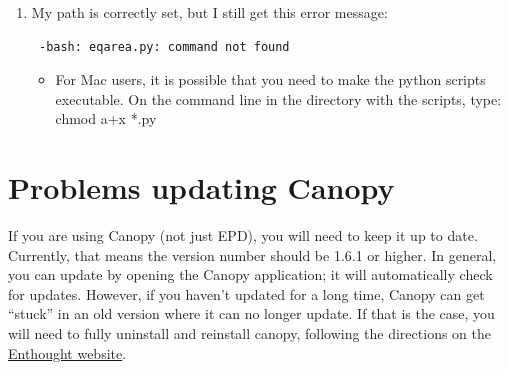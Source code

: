 \documentclass[11pt]{book}
\begin{document}
{{{{\begin{enumerate}
\begin{itemize}
\item For Windows users:

\begin{verbatim} "eqarea.py" is not recognized as an internal or external command,
operable program or batch file.
\end{verbatim}

Setting your path should not be an issue in Windows if you are using the PmagPy prompt (created by the install script).  PmagPy functionality will be available only in the custom Command Prompt, so make sure you are using it.  However, if you do need to set your path for some reason, see:

 \href{http://www.mathworks.com/matlabcentral/answers/94933-how-do-i-set-my-system-path-under-windows}{Setting your Path in Windows}

\end {itemize}

\item  My path is correctly set, but I still get this error message: \begin{verbatim} -bash: eqarea.py: command not found
\end{verbatim}

\begin{itemize}
\item  For Mac users, it is possible that you need to make the python scripts executable. On the command line in the directory with the scripts, type: chmod a+x *.py
\end{itemize}

\end{enumerate}

\section{Problems updating Canopy}
If you are using Canopy (not just EPD), you will need to keep it up to date.  Currently, that means the version number should be 1.6.1 or higher.  In general, you can update by opening the Canopy application; it will automatically check for updates.  However, if you haven't updated for a long time, Canopy can get ``stuck'' in an old version where it can no longer update.  If that is the case, you will need to fully uninstall and reinstall canopy, following the directions on the \href{https://support.enthought.com/hc/en-us/articles/204469570-Canopy-shows-no-updates-available-reinstalling-from-the-website}{Enthought website}.

}}}}
\end{document}
